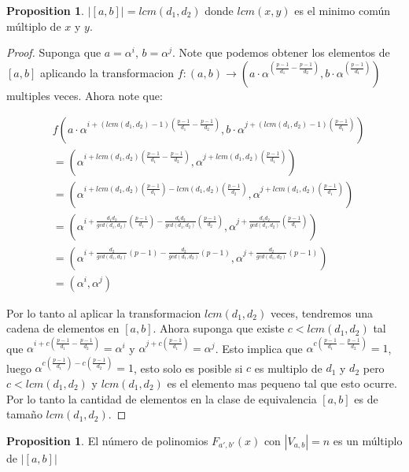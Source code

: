 \documentclass{article}
\theoremstyle{definition}
\newtheorem{prop}[theorem]{Proposition}
\theoremstyle{remark}
\numberwithin{equation}{section}
\begin{document}
\begin{prop}
  
  $|[a, b]| = lcm(d_1,d_2)$ donde $lcm(x,y)$ es el minimo com\'un m\'ultiplo de $x$ y $y$.

\end{prop}

\begin{proof}

  Suponga que $a=\alpha^i$, $b=\alpha^j$. Note que podemos obtener los elementos de $[a,b]$ aplicando la transformacion $f:(a,b) \rightarrow ( a\cdot\alpha^{(\frac{p-1}{d_1} - \frac{p-1}{d_2})}, b\cdot\alpha^{(\frac{p-1}{d_1})} )$ multiples veces. Ahora note que:

  \begin{align*}
  & f(a\cdot \alpha^{i+(lcm(d_1,d_2) - 1)(\frac{p-1}{d_1} - \frac{p-1}{d_2})}, b\cdot\alpha^{j+(lcm(d_1,d_2) - 1)(\frac{p-1}{d_1})}) \\
  & = (\alpha^{i+lcm(d_1,d_2)(\frac{p-1}{d_1}-\frac{p-1}{d_2})}, \alpha^{j+lcm(d_1,d_2)(\frac{p-1}{d_1})}) \\
  & = (\alpha^{i+lcm(d_1,d_2)(\frac{p-1}{d_1})-lcm(d_1,d_2)(\frac{p-1}{d_2})}, \alpha^{j+lcm(d_1,d_2)(\frac{p-1}{d_1})}) \\
    & = (\alpha^{i+\frac{d_1d_2}{gcd(d_1,d_2)}(\frac{p-1}{d_1})-\frac{d_1d_2}{gcd(d_1,d_2)}(\frac{p-1}{d_2})}, \alpha^{j+\frac{d_1d_2}{gcd(d_1,d_2)}(\frac{p-1}{d_1})}) \\
  & = (\alpha^{i+\frac{d_2}{gcd(d_1,d_2)}(p-1)-\frac{d_2}{gcd(d_1,d_2)}(p-1)}, \alpha^{j+\frac{d_2}{gcd(d_1,d_2)}(p-1)}) \\
  & = (\alpha^i, \alpha^j)
  \end{align*}

  Por lo tanto al aplicar la transformacion $lcm(d_1,d_2)$ veces, tendremos una cadena de elementos en $[a,b]$. Ahora suponga que existe $c < lcm(d_1,d_2)$ tal que $\alpha^{i+c(\frac{p-1}{d_1} - \frac{p-1}{d_2})} = \alpha^i$ y $\alpha^{j+c(\frac{p-1}{d_1})} = \alpha^j$. Esto implica que $\alpha^{c(\frac{p-1}{d_1} - \frac{p-1}{d_2})} = 1$, luego $\alpha^{c(\frac{p-1}{d_1}) - c(\frac{p-1}{d_2})} = 1$, esto solo es posible si $c$ es multiplo de $d_1$ y $d_2$ pero $c < lcm(d_1,d_2)$ y $lcm(d_1,d_2)$ es el elemento mas pequeno tal que esto ocurre. Por lo tanto la cantidad de elementos en la clase de equivalencia $[ a,b]$ es de tama\~no $lcm(d_1,d_2)$.
  
\end{proof}

\begin{prop}

  El n\'umero de polinomios $F_{a', b'}(x)$ con $|V_{a, b}| = n$ es un m\'ultiplo de $|[a, b]|$

\end{prop}

 
  
\end{document}
